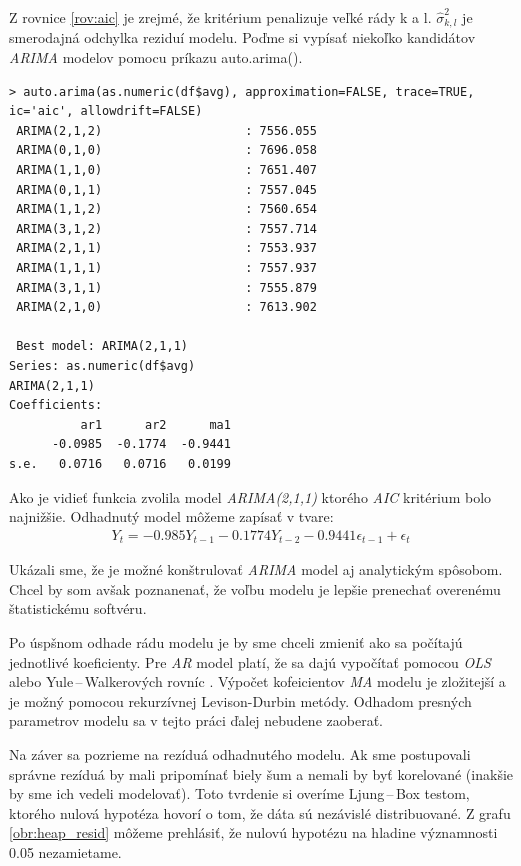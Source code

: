 \documentclass[12pt,a4paper,oneside,final]{article}
\theoremstyle{definition}
\theoremstyle{remark}
\numberwithin{equation}{section}
\begin{document}
Z rovnice \ref{rov:aic} je zrejmé, že kritérium penalizuje veľké rády k a l. 
$\hat{\sigma}^{2}_{k,l}$ je smerodajná odchylka reziduí modelu. 
Poďme si vypísať niekoľko kandidátov \emph{ARIMA} modelov pomocu príkazu auto.arima().

\begin{minipage}{\linewidth}
\begingroup
\fontsize{9pt}{7pt}\selectfont
\begin{verbatim}
> auto.arima(as.numeric(df$avg), approximation=FALSE, trace=TRUE, ic='aic', allowdrift=FALSE)
 ARIMA(2,1,2)                    : 7556.055
 ARIMA(0,1,0)                    : 7696.058
 ARIMA(1,1,0)                    : 7651.407
 ARIMA(0,1,1)                    : 7557.045
 ARIMA(1,1,2)                    : 7560.654
 ARIMA(3,1,2)                    : 7557.714
 ARIMA(2,1,1)                    : 7553.937
 ARIMA(1,1,1)                    : 7557.937
 ARIMA(3,1,1)                    : 7555.879
 ARIMA(2,1,0)                    : 7613.902

 Best model: ARIMA(2,1,1)                    
Series: as.numeric(df$avg) 
ARIMA(2,1,1)                    
Coefficients:
          ar1      ar2      ma1
      -0.0985  -0.1774  -0.9441
s.e.   0.0716   0.0716   0.0199
\end{verbatim}
\endgroup
\end{minipage}

Ako je vidieť funkcia zvolila model \emph{ARIMA(2,1,1)} ktorého \emph{AIC} kritérium bolo najnižšie.
Odhadnutý model môžeme zapísať v tvare:
\begin{eqnarray} \label{rov:arima_model}
    Y_t = -0.985 Y_{t-1} - 0.1774 Y_{t-2} -0.9441\epsilon_{t-1} + \epsilon_{t}
\end{eqnarray}

Ukázali sme, že je možné konštrulovať \emph{ARIMA} model aj analytickým spôsobom. 
Chcel by som avšak poznanenať, že voľbu modelu je lepšie prenechať overenému 
štatistickému softvéru. 

Po úspšnom odhade rádu modelu je by sme chceli zmieniť ako sa počítajú jednotlivé
koeficienty. Pre \emph{AR} model platí, že sa dajú vypočítať pomocou \emph{OLS} alebo Yule\,--\,Walkerových
rovníc \cite{brockwell_ts}. Výpočet kofeicientov \emph{MA} modelu je zložitejší a 
je možný pomocou rekurzívnej Levison-Durbin metódy.
Odhadom presných parametrov modelu sa v tejto práci ďalej nebudene zaoberať.  

Na záver sa pozrieme na rezíduá odhadnutého modelu. Ak sme postupovali správne rezíduá by
mali pripomínať biely šum a nemali by byť korelované (inakšie by sme ich
vedeli modelovať). Toto tvrdenie si overíme Ljung\,--\,Box testom, ktorého nulová hypotéza
hovorí o tom, že dáta sú nezávislé distribuované. Z grafu \ref{obr:heap_resid} môžeme
prehlásiť, že nulovú hypotézu na hladine významnosti 0.05 nezamietame.
\end{document}
